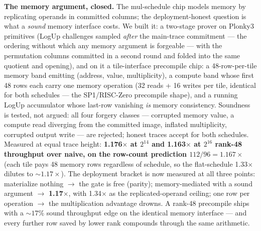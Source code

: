 \documentclass[10pt]{article}
\begin{document}
\textbf{The memory argument, closed.} The mul-schedule chip models
memory by replicating operands in committed columns; the
deployment-honest question is what a \emph{sound} memory interface
costs. We built it: a two-stage prover on Plonky3 primitives
(LogUp challenges sampled \emph{after} the main-trace commitment
--- the ordering without which any memory argument is forgeable ---
with the permutation columns committed in a second round and
folded into the same quotient and opening), and on it a
tile-interface precompile chip: a 48-row-per-tile memory band
emitting (address, value, multiplicity), a compute band whose
first 48 rows each carry one memory operation (32 reads + 16
writes per tile, identical for both schedules --- the
SP1/RISC-Zero precompile shape), and a running LogUp accumulator
whose last-row vanishing \emph{is} memory consistency. Soundness
is tested, not argued: all four forgery classes --- corrupted
memory value, a compute read diverging from the committed image,
inflated multiplicity, corrupted output write --- are rejected;
honest traces accept for both schedules. Measured at equal trace
height: \textbf{1.176$\times$ at $2^{14}$ and 1.163$\times$ at
$2^{16}$ rank-48 throughput over naive, on the row-count
prediction $112/96 = 1.167\times$} (each tile pays 48 memory rows
regardless of schedule, so the flat-schedule 1.33$\times$ dilutes
to ${\sim}1.17\times$). The deployment bracket is now measured at
all three points: materialize nothing $\to$ the gate is free
(parity); memory-mediated with a sound argument $\to$
\textbf{1.17$\times$}, with 1.34$\times$ as the
replicated-operand ceiling; one row per operation $\to$ the
multiplication advantage drowns. A rank-48 precompile ships with a
${\sim}17\%$ sound throughput edge on the identical memory
interface --- and every further row saved by lower rank compounds
through the same arithmetic.
\end{document}
